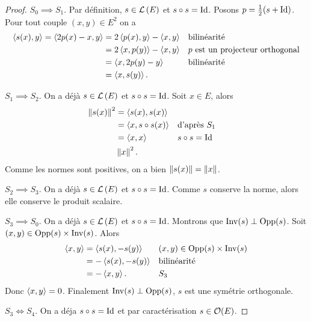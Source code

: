 \begin{proof}
  \(S_0 \implies S_1\). Par définition, \(s \in \mathcal{L}\left(E\right)\) et \(s \circ s=\operatorname{Id}\). Posons \(p=\frac{1}{2}(s+\operatorname{Id})\). Pour tout couple \((x,y) \in E^2\) on a
  \begin{align}
    \left\langle{s(x)},{y}\right\rangle = \left\langle{2p(x)-x},{y}\right\rangle & = 2\left\langle{p(x)},{y}\right\rangle-\left\langle{x},{y}\right\rangle && \text{bilinéarité}\\
                                               &=2\left\langle{x},{p(y)}\right\rangle-\left\langle{x},{y}\right\rangle && p\text{~est un projecteur orthogonal}\\
                                               &=\left\langle{x},{2p(y)-y}\right\rangle && \text{bilinéarité}\\
                                               &=\left\langle{x},{s(y)}\right\rangle.
  \end{align}

  \(S_1 \implies S_2\). On a déjà \(s \in \mathcal{L}\left(E\right)\) et \(s \circ s=\operatorname{Id}\). Soit \(x \in E\), alors
  \begin{align}
    \left\lVert s(x)\right\rVert^2 &=\left\langle{s(x)},{s(x)}\right\rangle \\
                   &=\left\langle{x},{s\circ s(x)}\right\rangle &&\text{d'après~} S_1 \\
                   &=\left\langle{x},{x}\right\rangle && s\circ s=\operatorname{Id} \\
                   &\left\lVert x\right\rVert^2.
  \end{align}
  Comme les normes sont positives, on a bien \(\left\lVert s(x)\right\rVert=\left\lVert x\right\rVert\).

  \(S_2 \implies S_3\). On a déjà \(s \in \mathcal{L}\left(E\right)\) et \(s \circ s=\operatorname{Id}\). Comme \(s\) conserve la norme, alors elle conserve le produit scalaire.

  \(S_3 \implies S_0\). On a déjà \(s \in \mathcal{L}\left(E\right)\) et \(s \circ s=\operatorname{Id}\). Montrons que \(\operatorname{Inv}(s)\perp \operatorname{Opp}(s)\). Soit \((x,y) \in \operatorname{Opp}(s) \times \operatorname{Inv}(s)\). Alors
  \begin{align}
    \left\langle{x},{y}\right\rangle &= \left\langle{s(x)},{-s(y)}\right\rangle && (x,y) \in \operatorname{Opp}(s) \times \operatorname{Inv}(s) \\
                    &=-\left\langle{s(x)},{-s(y)}\right\rangle && \text{bilinéarité} \\
                    &=-\left\langle{x},{y}\right\rangle. && S_3
  \end{align}
  Donc \(\left\langle{x},{y}\right\rangle=0\). Finalement \(\operatorname{Inv}(s)\perp \operatorname{Opp}(s)\), \(s\) est une symétrie orthogonale.

  \(S_3 \iff S_4\). On a déja \(s \circ s=\operatorname{Id}\) et par caractérisation \(s \in \mathcal{O}\!\left(E\right)\). 
\end{proof}


